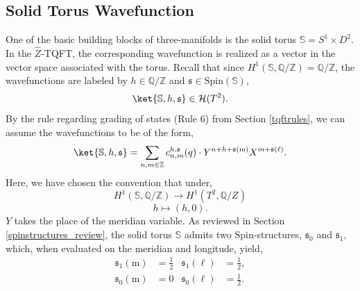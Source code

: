 \documentclass{article}
\newcommand{\Z}{{\mathbb Z}}
\newcommand{\Q}{{\mathbb Q}}
\newcommand{\m}{{\mathrm{m}}}
\def\be{\begin{equation}}
\def\ee{\end{equation}}
\numberwithin{corollary}{theorem}
\numberwithin{corollary}{proposition}
\begin{document}
\subsection{Solid Torus Wavefunction} \label{solid_torus_sec}

One of the basic building blocks of three-manifolds is the solid torus $\mathbb{S} = S^1\times D^2$. In the $\hat{Z}$-TQFT, the corresponding wavefunction is realized as a vector in the vector space associated with the torus. Recall that since $H^1(\mathbb{S},\Q/\Z) = \Q/\Z$, the wavefunctions are labeled by $h\in \Q/\Z$ and $\mathfrak{s} \in  \mathrm{Spin}(\mathbb{S})$,
$$\ket{\mathbb{S},h,\mathfrak{s}}\in \mathcal{H}(T^2).$$
By the rule regarding grading of states (Rule 6) from Section \ref{tqftrules}, we can assume the wavefunctions to be of the form, 
\be \label{solidtorus_decorated_sectors} \ket{\mathbb{S},h,\mathfrak{s}} =  \sum_{n,m\in \Z} c^{h,\mathfrak{s}}_{n,m}(q) \cdot Y^{n+h+\mathfrak{s}(\m)}X^{m+\mathfrak{s}(\ell)} . \ee 
Here, we have chosen the convention that under,
$$H^1(\mathbb{S},\Q/\Z) \rightarrow H^1(T^2,\Q/Z)$$
$$h\mapsto (h,0). $$
$Y$ takes the place of the meridian variable. As reviewed in Section \ref{spinstructures_review}, the solid torus $\mathbb{S}$ admits two $\mathrm{Spin}$-structures, $\mathfrak{s}_0$ and $\mathfrak{s}_1$, which, when evaluated on the meridian and longitude, yield, 
\begin{align*}
    \mathfrak{s}_1 (\m)& = \frac{1}{2} & \mathfrak{s}_1 (\ell) &=\frac{1}{2}, \\
    \mathfrak{s}_0 (\m) & = 0 & \mathfrak{s}_0 (\ell) &=\frac{1}{2}.
\end{align*}
\end{document}
